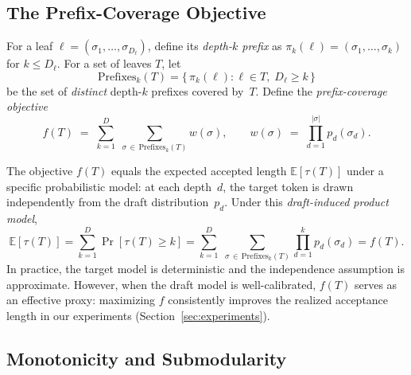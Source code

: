 \subsection{The Prefix-Coverage Objective}
\label{sec:objective}

\begin{definition}
\label{def:objective}
For a leaf $\ell = (\sigma_1, \dots, \sigma_{D_\ell})$, define its
\emph{depth-$k$ prefix} as $\pi_k(\ell) = (\sigma_1, \dots, \sigma_k)$
for $k \leq D_\ell$.  For a set of leaves $T$, let
\[
  \mathrm{Prefixes}_k(T)
  = \bigl\{\, \pi_k(\ell) : \ell \in T,\; D_\ell \geq k \,\bigr\}
\]
be the set of \emph{distinct} depth-$k$ prefixes covered by~$T$.
Define the \emph{prefix-coverage objective}
\begin{equation}
\label{eq:objective}
  f(T)
  \;=\; \sum_{k=1}^{D}\;\sum_{\sigma \,\in\, \mathrm{Prefixes}_k(T)}
        w(\sigma),
  \qquad
  w(\sigma)
  \;=\; \prod_{d=1}^{|\sigma|} p_d(\sigma_d).
\end{equation}
\end{definition}

\begin{remark}
\label{rem:interpretation}
The objective $f(T)$ equals the expected accepted length
$\mathbb{E}[\tau(T)]$ under a specific probabilistic model: at each
depth~$d$, the target token is drawn independently from the draft
distribution~$p_d$.  Under this \emph{draft-induced product model},
\[
  \mathbb{E}[\tau(T)]
  = \sum_{k=1}^{D} \Pr[\tau(T) \geq k]
  = \sum_{k=1}^{D}\;\sum_{\sigma \,\in\, \mathrm{Prefixes}_k(T)}
    \prod_{d=1}^{k} p_d(\sigma_d)
  = f(T).
\]
In practice, the target model is deterministic and the independence
assumption is approximate.  However, when the draft model is
well-calibrated, $f(T)$ serves as an effective proxy: maximizing $f$
consistently improves the realized acceptance length in our experiments
(Section~\ref{sec:experiments}).
\end{remark}

\subsection{Monotonicity and Submodularity}
\label{sec:submodularity}

